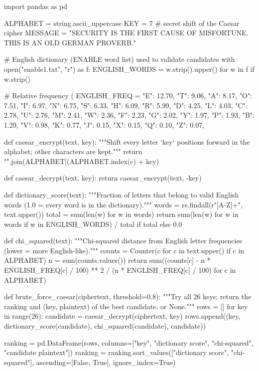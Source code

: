 \documentclass[a4paper, 10pt]{article}
\begin{document}
\begin{problem}
\begin{subproblems_alpha}
\begin{solution}
\begin{codingbox*}[language=Python, belowskip=6pt]
import pandas as pd

ALPHABET = string.ascii_uppercase
KEY = 7  # secret shift of the Caesar cipher
MESSAGE = "SECURITY IS THE FIRST CAUSE OF MISFORTUNE. THIS IS AN OLD GERMAN PROVERB."

# English dictionary (ENABLE word list) used to validate candidates
with open("enable1.txt", "r") as f:
    ENGLISH_WORDS = {w.strip().upper() for w in f if w.strip()}

# Relative frequency (%
ENGLISH_FREQ = {
    "E": 12.70, "T": 9.06, "A": 8.17, "O": 7.51, "I": 6.97, "N": 6.75, "S": 6.33,
    "H": 6.09, "R": 5.99, "D": 4.25, "L": 4.03, "C": 2.78, "U": 2.76, "M": 2.41,
    "W": 2.36, "F": 2.23, "G": 2.02, "Y": 1.97, "P": 1.93, "B": 1.29, "V": 0.98,
    "K": 0.77, "J": 0.15, "X": 0.15, "Q": 0.10, "Z": 0.07,
}

def caesar_encrypt(text, key):
    """Shift every letter `key` positions forward in the alphabet; other characters are kept."""
    return "".join(ALPHABET[(ALPHABET.index(c) + key) %

def caesar_decrypt(text, key):
    return caesar_encrypt(text, -key)

def dictionary_score(text):
    """Fraction of letters that belong to valid English words (1.0 = every word is in the dictionary)."""
    words = re.findall(r"[A-Z]+", text.upper())
    total = sum(len(w) for w in words)
    return sum(len(w) for w in words if w in ENGLISH_WORDS) / total if total else 0.0

def chi_squared(text):
    """Chi-squared distance from English letter frequencies (lower = more English-like)."""
    counts = Counter(c for c in text.upper() if c in ALPHABET)
    n = sum(counts.values())
    return sum((counts[c] - n * ENGLISH_FREQ[c] / 100) ** 2 / (n * ENGLISH_FREQ[c] / 100) for c in ALPHABET)

def brute_force_caesar(ciphertext, threshold=0.8):
    """Try all 26 keys; return the ranking and (key, plaintext) of the best candidate, or None."""
    rows = []
    for key in range(26):
        candidate = caesar_decrypt(ciphertext, key)
        rows.append((key, dictionary_score(candidate), chi_squared(candidate), candidate))

    ranking = pd.DataFrame(rows, columns=["key", "dictionary score", "chi-squared", "candidate plaintext"])
    ranking = ranking.sort_values(["dictionary score", "chi-squared"], ascending=[False, True], ignore_index=True)


\end{codingbox*}
\end{solution}
\end{subproblems_alpha}
\end{problem}
\end{document}

